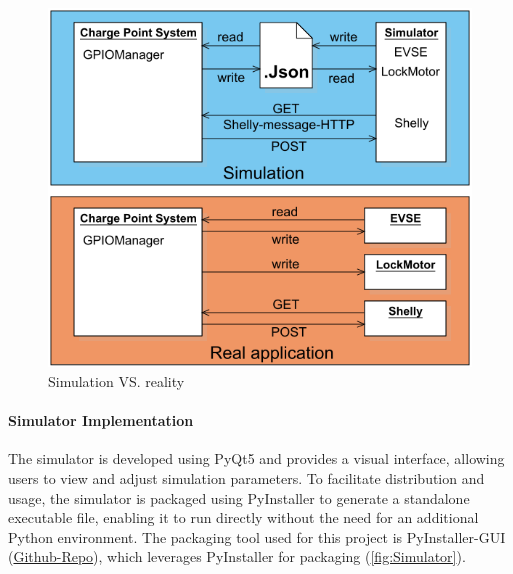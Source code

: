 \documentclass[
	english,
	ruledheaders=section,%
	class=report,%
	thesis={type=Report},%
	accentcolor=9c,%
	custommargins=true,%
	marginpar=false,%
	parskip=half-,%
	fontsize=11pt,%
	logofile={img/tuda_logo.pdf}, %
]{tudapub}
\begin{document}
\begin{figure}[H]
    \centering
    \includegraphics[width=0.66\linewidth]{img/Simulation.png}
    \caption{Simulation VS. reality}
    \label{fig:SimulationFrame}
\end{figure}




\paragraph{Simulator Implementation}
The simulator is developed using PyQt5 and provides a visual interface, allowing users to view and adjust simulation parameters. To facilitate distribution and usage, the simulator is packaged using PyInstaller to generate a standalone executable file, enabling it to run directly without the need for an additional Python environment. The packaging tool used for this project is PyInstaller-GUI (\href{https://github.com/Jf-JIN/Pyinstaller-GUI/releases/tag/v4.0.1}{Github-Repo}), which leverages PyInstaller for packaging (\autoref{fig:Simulator}).
\end{document}
